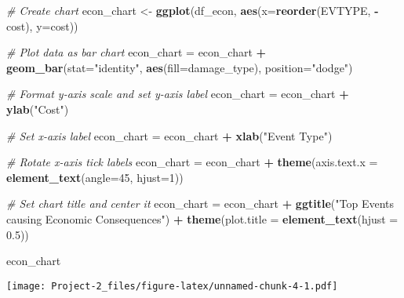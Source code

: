 \documentclass[
]{article}
\newenvironment{Shaded}{\begin{snugshade}}{\end{snugshade}}
\newcommand{\AttributeTok}[1]{\textcolor[rgb]{0.13,0.29,0.53}{#1}}
\newcommand{\CommentTok}[1]{\textcolor[rgb]{0.56,0.35,0.01}{\textit{#1}}}
\newcommand{\DecValTok}[1]{\textcolor[rgb]{0.00,0.00,0.81}{#1}}
\newcommand{\FloatTok}[1]{\textcolor[rgb]{0.00,0.00,0.81}{#1}}
\newcommand{\FunctionTok}[1]{\textcolor[rgb]{0.13,0.29,0.53}{\textbf{#1}}}
\newcommand{\NormalTok}[1]{#1}
\newcommand{\OtherTok}[1]{\textcolor[rgb]{0.56,0.35,0.01}{#1}}
\newcommand{\SpecialCharTok}[1]{\textcolor[rgb]{0.81,0.36,0.00}{\textbf{#1}}}
\newcommand{\StringTok}[1]{\textcolor[rgb]{0.31,0.60,0.02}{#1}}
\begin{document}
\begin{Shaded}
\begin{Highlighting}[]
\CommentTok{\# Create chart}
\NormalTok{econ\_chart }\OtherTok{\textless{}{-}} \FunctionTok{ggplot}\NormalTok{(df\_econ, }\FunctionTok{aes}\NormalTok{(}\AttributeTok{x=}\FunctionTok{reorder}\NormalTok{(EVTYPE, }\SpecialCharTok{{-}}\NormalTok{cost), }\AttributeTok{y=}\NormalTok{cost))}

\CommentTok{\# Plot data as bar chart}
\NormalTok{econ\_chart }\OtherTok{=}\NormalTok{ econ\_chart }\SpecialCharTok{+} \FunctionTok{geom\_bar}\NormalTok{(}\AttributeTok{stat=}\StringTok{"identity"}\NormalTok{, }\FunctionTok{aes}\NormalTok{(}\AttributeTok{fill=}\NormalTok{damage\_type), }\AttributeTok{position=}\StringTok{"dodge"}\NormalTok{)}

\CommentTok{\# Format y{-}axis scale and set y{-}axis label}
\NormalTok{econ\_chart }\OtherTok{=}\NormalTok{ econ\_chart }\SpecialCharTok{+} \FunctionTok{ylab}\NormalTok{(}\StringTok{"Cost"}\NormalTok{) }

\CommentTok{\# Set x{-}axis label}
\NormalTok{econ\_chart }\OtherTok{=}\NormalTok{ econ\_chart }\SpecialCharTok{+} \FunctionTok{xlab}\NormalTok{(}\StringTok{"Event Type"}\NormalTok{) }

\CommentTok{\# Rotate x{-}axis tick labels }
\NormalTok{econ\_chart }\OtherTok{=}\NormalTok{ econ\_chart }\SpecialCharTok{+} \FunctionTok{theme}\NormalTok{(}\AttributeTok{axis.text.x =} \FunctionTok{element\_text}\NormalTok{(}\AttributeTok{angle=}\DecValTok{45}\NormalTok{, }\AttributeTok{hjust=}\DecValTok{1}\NormalTok{))}

\CommentTok{\# Set chart title and center it}
\NormalTok{econ\_chart }\OtherTok{=}\NormalTok{ econ\_chart }\SpecialCharTok{+} \FunctionTok{ggtitle}\NormalTok{(}\StringTok{"Top Events causing Economic Consequences"}\NormalTok{) }\SpecialCharTok{+} \FunctionTok{theme}\NormalTok{(}\AttributeTok{plot.title =} \FunctionTok{element\_text}\NormalTok{(}\AttributeTok{hjust =} \FloatTok{0.5}\NormalTok{))}

\NormalTok{econ\_chart}
\end{Highlighting}
\end{Shaded}

\texttt{[image: Project-2\_files/figure-latex/unnamed-chunk-4-1.pdf]}
\end{document}
